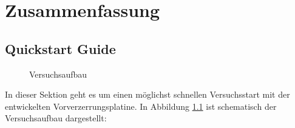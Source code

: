 \chapter{Zusammenfassung}
\section{Quickstart Guide}
\label{sec:qg}
\begin{figure}[h]
	\centering
	\def\svgwidth{0.8\textwidth}
	
	\caption{Versuchsaufbau}
	\label{img:verbau}
\end{figure}

In dieser Sektion geht es um einen möglichst schnellen Versuchsstart mit der entwickelten Vorverzerrungsplatine. In Abbildung \ref{img:verbau} ist schematisch der Versuchsaufbau dargestellt:


